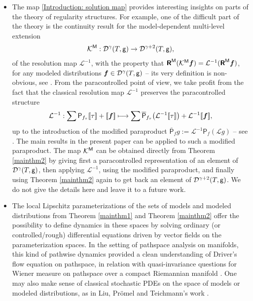 \documentclass[JEP,XML,SOM,Unicode,published]{cedram}
\newcommand\mto{\mathchoice{\longmapsto}{\mapsto}{\mapsto}{\mapsto}}
\theoremstyle{plain}
\theoremstyle{definition}
\newcommand{\Brac}[1]{[\![#1]\!]}
\newcommand{\bsf}{\boldsymbol{f}}
\newcommand{\reR}{\boldsymbol{\mathsf{R}}}
\newcommand{\sfP}{\mathsf{P}}
\newcommand{\mcD}{\mathcal{D}}
\newcommand{\mcK}{\mathcal{K}}
\newcommand{\mcL}{\mathcal{L}}
\begin{document}
\begin{itemize}
	\item The map \eqref {Introduction: solution map} provides interesting insights on parts of the theory of regularity structures. For example, one of the difficult part of the theory is the continuity result for the model-dependent multi-level extension
\[
\mcK^{\sf M}: \mcD^\gamma(T,{\sf g}) \to \mcD^{\gamma+2}(T,{\sf g}),
\]
of the resolution map $\mcL^{-1}$, with the property that $\reR^{\sf M}(\mcK^{\sf M}\bsf)=\mcL^{-1}(\reR^{\sf M}\bsf)$, for any modeled distributions $\bsf\in\mcD^\gamma(T,{\sf g})$ -- its very definition is non-obvious, see \cite[\S 5]{Hai}. From the paracontrolled
point of view, we take profit from the fact that the classical resolution map $\mcL^{-1}$ preserves the paracontrolled structure
\[
\mcL^{-1}:\sum \sfP_{f_\tau}\Brac{\tau}+\Brac{\bsf}\mto \sum \overline{\sfP}_{f_\tau}\bigl(\mcL^{-1}\Brac{\tau}\bigr) + \mcL^{-1}\Brac{\bsf},
\]
up to the introduction of the modified paraproduct $\overline{\sfP}_fg := \mcL^{-1}\sfP_f(\mcL g)$ -- see \cite{BB16}. The main results in the present paper can be applied to such a modified paraproduct. The map $\mcK^{\sf M}$ can be obtained directly from Theorem \ref{mainthm2} by giving first a paracontrolled representation of an element of $\mcD^\gamma(T,{\sf g})$, then applying $\mcL^{-1}$, using the modified paraproduct, and finally using Theorem \ref{mainthm2} again to get back an element of $\mcD^{\gamma+2}(T,{\sf g})$. We do not give the details here and leave it to a future work.
	
	\item The local Lipschitz parameterizations of the sets of models and modeled distributions from Theorem \ref{mainthm1} and Theorem \ref{mainthm2} offer the possibility to define dynamics in these spaces by solving ordinary (or controlled/rough) differential equations driven by vector fields on the parameterization spaces. In the setting of pathspace analysis on manifolds, this kind of pathwise dynamics provided a clean understanding of Driver's flow equation on pathspace, in relation with quasi-invariance questions for Wiener measure on pathspace over a compact Riemannian manifold \cite{DriverFlow, LyonsQian, BailleulRegularity}. One may also make sense of classical stochastic PDEs on the space of models or modeled distributions, as in Liu, Prömel and Teichmann's work \cite{LPT18}.
\end{itemize}
\end{document}
